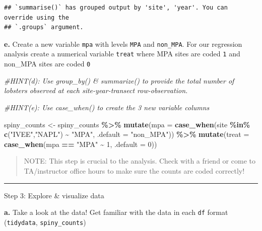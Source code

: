 \documentclass[
]{article}
\newenvironment{Shaded}{\begin{snugshade}}{\end{snugshade}}
\newcommand{\AttributeTok}[1]{\textcolor[rgb]{0.13,0.29,0.53}{#1}}
\newcommand{\CommentTok}[1]{\textcolor[rgb]{0.56,0.35,0.01}{\textit{#1}}}
\newcommand{\DecValTok}[1]{\textcolor[rgb]{0.00,0.00,0.81}{#1}}
\newcommand{\FunctionTok}[1]{\textcolor[rgb]{0.13,0.29,0.53}{\textbf{#1}}}
\newcommand{\NormalTok}[1]{#1}
\newcommand{\OtherTok}[1]{\textcolor[rgb]{0.56,0.35,0.01}{#1}}
\newcommand{\SpecialCharTok}[1]{\textcolor[rgb]{0.81,0.36,0.00}{\textbf{#1}}}
\newcommand{\StringTok}[1]{\textcolor[rgb]{0.31,0.60,0.02}{#1}}
\begin{document}
\begin{verbatim}
## `summarise()` has grouped output by 'site', 'year'. You can override using the
## `.groups` argument.
\end{verbatim}

\textbf{e.} Create a new variable \texttt{mpa} with levels \texttt{MPA}
and \texttt{non\_MPA}. For our regression analysis create a numerical
variable \texttt{treat} where MPA sites are coded \texttt{1} and
non\_MPA sites are coded \texttt{0}

\begin{Shaded}
\begin{Highlighting}[]
\CommentTok{\#HINT(d): Use \textasciigrave{}group\_by()\textasciigrave{} \& \textasciigrave{}summarize()\textasciigrave{} to provide the total number of lobsters observed at each site{-}year{-}transect row{-}observation. }

\CommentTok{\#HINT(e): Use \textasciigrave{}case\_when()\textasciigrave{} to create the 3 new variable columns}

\NormalTok{spiny\_counts }\OtherTok{\textless{}{-}}\NormalTok{ spiny\_counts }\SpecialCharTok{\%\textgreater{}\%}
  \FunctionTok{mutate}\NormalTok{(}\AttributeTok{mpa =} \FunctionTok{case\_when}\NormalTok{(site }\SpecialCharTok{\%in\%} \FunctionTok{c}\NormalTok{(}\StringTok{"IVEE"}\NormalTok{,}\StringTok{"NAPL"}\NormalTok{) }\SpecialCharTok{\textasciitilde{}} \StringTok{"MPA"}\NormalTok{,}
                                       \AttributeTok{.default =} \StringTok{"non\_MPA"}\NormalTok{)) }\SpecialCharTok{\%\textgreater{}\%}
  \FunctionTok{mutate}\NormalTok{(}\AttributeTok{treat =} \FunctionTok{case\_when}\NormalTok{(mpa }\SpecialCharTok{==} \StringTok{"MPA"} \SpecialCharTok{\textasciitilde{}} \DecValTok{1}\NormalTok{,}
                           \AttributeTok{.default =} \DecValTok{0}\NormalTok{)) }
\end{Highlighting}
\end{Shaded}

\begin{quote}
NOTE: This step is crucial to the analysis. Check with a friend or come
to TA/instructor office hours to make sure the counts are coded
correctly!
\end{quote}

\begin{center}\rule{0.5\linewidth}{0.5pt}\end{center}

Step 3: Explore \& visualize data

\textbf{a.} Take a look at the data! Get familiar with the data in each
\texttt{df} format (\texttt{tidydata}, \texttt{spiny\_counts})
\end{document}

